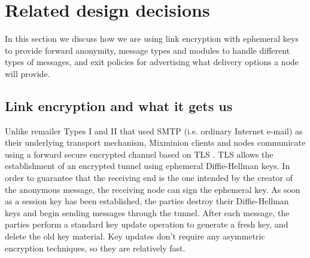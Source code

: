 \documentclass{llncs}
\begin{document}
\section{Related design decisions}

In this section we discuss how we are using
link encryption with ephemeral keys to provide forward anonymity,
message types and modules to handle different types of messages, and
exit policies for advertising what delivery options a node will provide.

\subsection{Link encryption and what it gets us}
\label{subsec:link-encrypt}

Unlike remailer Types I and II that used SMTP \cite{SMTP} (i.e. ordinary
Internet e-mail) as their underlying transport mechanism, Mixminion
clients and nodes communicate using a forward secure encrypted channel
based on TLS \cite{TLS}.  
TLS allows the establishment of an encrypted tunnel using ephemeral
Diffie-Hellman keys. In order to guarantee that the receiving end is
the one intended by the creator of the anonymous message, the
receiving node can sign the ephemeral key. As soon as a session key
has been established, the parties destroy their Diffie-Hellman keys
and begin sending messages through the tunnel. After each message, the
parties perform a standard key update operation to generate a fresh
key, and delete the old key material.  Key updates don't require any
asymmetric encryption techniques, so they are relatively fast.

%


%
\end{document}

